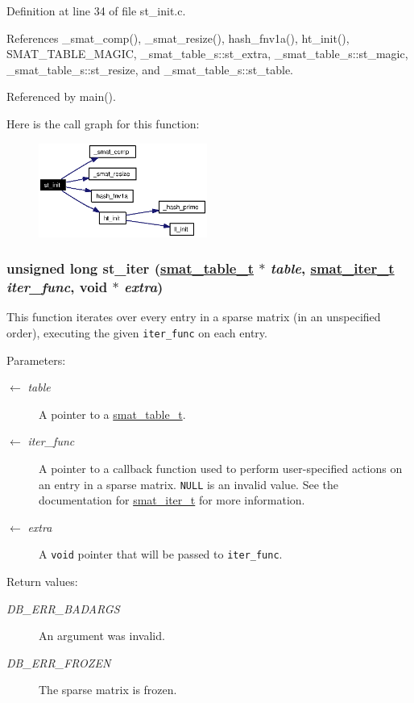 Definition at line 34 of file st\_\-init.c.

References \_\-smat\_\-comp(), \_\-smat\_\-resize(), hash\_\-fnv1a(), ht\_\-init(), SMAT\_\-TABLE\_\-MAGIC, \_\-smat\_\-table\_\-s::st\_\-extra, \_\-smat\_\-table\_\-s::st\_\-magic, \_\-smat\_\-table\_\-s::st\_\-resize, and \_\-smat\_\-table\_\-s::st\_\-table.

Referenced by main().

Here is the call graph for this function:\begin{figure}[H]
\begin{center}
\leavevmode
\includegraphics[width=157pt]{group__dbprim__smat_ga12_cgraph}
\end{center}
\end{figure}
\hypertarget{group__dbprim__smat_ga16}{
\subsubsection[st\_\-iter]{\setlength{\rightskip}{0pt plus 5cm}unsigned long st\_\-iter (\hyperlink{struct__smat__table__s}{smat\_\-table\_\-t} $\ast$ {\em table}, \hyperlink{group__dbprim__smat_ga4}{smat\_\-iter\_\-t} {\em iter\_\-func}, void $\ast$ {\em extra})}}
\label{group__dbprim__smat_ga16}


This function iterates over every entry in a sparse matrix (in an unspecified order), executing the given {\tt iter\_\-func} on each entry.

\begin{Desc}
\item[Parameters:]
\begin{description}
\item[\mbox{$\leftarrow$} {\em table}]A pointer to a \hyperlink{group__dbprim__smat_ga0}{smat\_\-table\_\-t}. \item[\mbox{$\leftarrow$} {\em iter\_\-func}]A pointer to a callback function used to perform user-specified actions on an entry in a sparse matrix. {\tt NULL} is an invalid value. See the documentation for \hyperlink{group__dbprim__smat_ga4}{smat\_\-iter\_\-t} for more information. \item[\mbox{$\leftarrow$} {\em extra}]A {\tt void} pointer that will be passed to {\tt iter\_\-func}.\end{description}
\end{Desc}
\begin{Desc}
\item[Return values:]
\begin{description}
\item[{\em DB\_\-ERR\_\-BADARGS}]An argument was invalid. \item[{\em DB\_\-ERR\_\-FROZEN}]The sparse matrix is frozen.\end{description}
\end{Desc}



